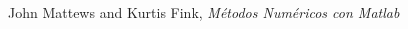 \documentclass[10pt,journal,compsoc]{IEEEtran}
\begin{document}









%
%
%


\begin{thebibliography}{1}

John Mattews and Kurtis Fink, \emph{M\'etodos Num\'ericos con Matlab}
\end{thebibliography}
\end{document}
